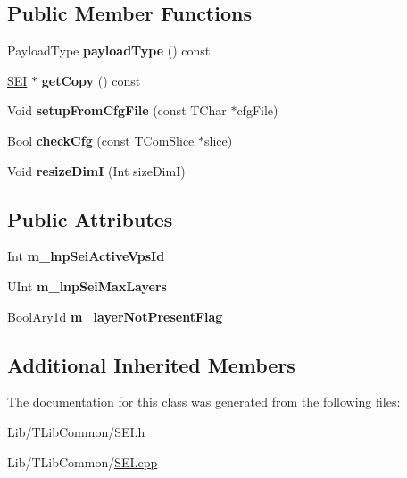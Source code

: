 \subsection*{Public Member Functions}
\begin{DoxyCompactItemize}
\item 
\mbox{\label{class_s_e_i_layers_not_present_a39a5477a394e25cd5e2ad9869ae915fd}} 
Payload\+Type {\bfseries payload\+Type} () const
\item 
\mbox{\label{class_s_e_i_layers_not_present_ac2695f5a1885aa9482b542486b675cae}} 
\hyperlink{class_s_e_i}{S\+EI} $\ast$ {\bfseries get\+Copy} () const
\item 
\mbox{\label{class_s_e_i_layers_not_present_a610eb21dc4786c231a20c8cde5d91763}} 
Void {\bfseries setup\+From\+Cfg\+File} (const T\+Char $\ast$cfg\+File)
\item 
\mbox{\label{class_s_e_i_layers_not_present_a158e6e58babbb51b8d315924792ff09d}} 
Bool {\bfseries check\+Cfg} (const \hyperlink{class_t_com_slice}{T\+Com\+Slice} $\ast$slice)
\item 
\mbox{\label{class_s_e_i_layers_not_present_a7ef48aa66f65e80f77d738d7de0cd7b2}} 
Void {\bfseries resize\+DimI} (Int size\+DimI)
\end{DoxyCompactItemize}
\subsection*{Public Attributes}
\begin{DoxyCompactItemize}
\item 
\mbox{\label{class_s_e_i_layers_not_present_a56c432ba2cbabe464952259b9d08082b}} 
Int {\bfseries m\+\_\+lnp\+Sei\+Active\+Vps\+Id}
\item 
\mbox{\label{class_s_e_i_layers_not_present_af6c1ca40b3dccd4c60452de01212fe52}} 
U\+Int {\bfseries m\+\_\+lnp\+Sei\+Max\+Layers}
\item 
\mbox{\label{class_s_e_i_layers_not_present_a3b2af617bbf76b138cc5df44cfe086f3}} 
Bool\+Ary1d {\bfseries m\+\_\+layer\+Not\+Present\+Flag}
\end{DoxyCompactItemize}
\subsection*{Additional Inherited Members}


The documentation for this class was generated from the following files\+:\begin{DoxyCompactItemize}
\item 
Lib/\+T\+Lib\+Common/S\+E\+I.\+h\item 
Lib/\+T\+Lib\+Common/\hyperlink{_s_e_i_8cpp}{S\+E\+I.\+cpp}\end{DoxyCompactItemize}
